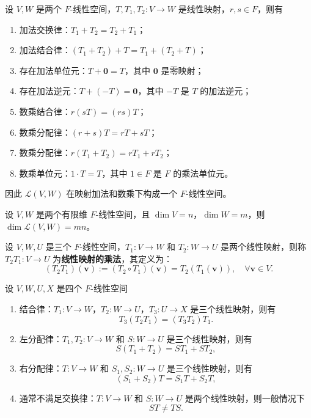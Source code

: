 \begin{proposition}[线性映射的线性空间]
    设 $V,W$ 是两个 $F$-线性空间，$T,T_1,T_2:V\to W$ 是线性映射，$r,s\in F$，则有
    \begin{enumerate}
        \item 加法交换律：$T_1+T_2 = T_2+T_1$；
        \item 加法结合律：$(T_1+T_2)+T = T_1+(T_2+T)$；
        \item 存在加法单位元：$T+\mathbf{0} = T$，其中 $\mathbf{0}$ 是零映射；
        \item 存在加法逆元：$T+(-T) = \mathbf{0}$，其中 $-T$ 是 $T$ 的加法逆元；
        \item 数乘结合律：$r(sT) = (rs)T$；
        \item 数乘分配律：$ (r+s)T = rT + sT $；
        \item 数乘分配律：$ r(T_1 + T_2) = rT_1 + rT_2 $；
        \item 数乘单位元：$1\cdot T = T$，其中 $1\in F$ 是 $F$ 的乘法单位元。
    \end{enumerate}
    因此 $\mathcal{L}(V,W)$ 在映射加法和数乘下构成一个 $F$-线性空间。
    \label{prop:linear_map_linear_space}
\end{proposition}
\vspace{1em}

\begin{proposition}[有限维线性映射空间的维度]
    设 $V,W$ 是两个有限维 $F$-线性空间，且 $\dim V = n$，$\dim W = m$，则 $\dim \mathcal{L}(V,W) = mn$。
    \label{prop:finite_dimensional_linear_map_space_dimension}
\end{proposition}

\begin{definition}[线性映射的乘法]
    设 $V,W,U$ 是三个 $F$-线性空间，$T_1:V\to W$ 和 $T_2:W\to U$ 是两个线性映射，则称 $T_2 T_1:V\to U$ 为\textbf{线性映射的乘法}，其定义为：
    \[
        (T_2 T_1)(\mathbf{v}) := (T_2 \circ T_1)(\mathbf{v}) = T_2(T_1(\mathbf{v})), \quad \forall \mathbf{v}\in V.
    \]
\end{definition}

\begin{proposition}[线性映射乘法的性质]
    设 $V,W,U,X$ 是四个 $F$-线性空间
    \begin{enumerate}
        \item 结合律：$T_1:V\to W$，$T_2:W\to U$，$T_3:U\to X$ 是三个线性映射，则有
        \[
            T_3(T_2 T_1) = (T_3 T_2) T_1.
        \]
        \item 左分配律：$T_1,T_2:V\to W$ 和 $S:W\to U$ 是三个线性映射，则有
        \[
            S(T_1 + T_2) = S T_1 + S T_2,
        \]
        \item 右分配律：$T:V\to W$ 和 $S_1,S_2:W\to U$ 是三个线性映射，则有
        \[
            (S_1 + S_2) T = S_1 T + S_2 T,
        \]
        \item 通常不满足交换律：$T:V\to W$ 和 $S:W\to U$ 是两个线性映射，则一般情况下
        \[
            ST \neq TS.
        \]
    \end{enumerate}
\end{proposition}

